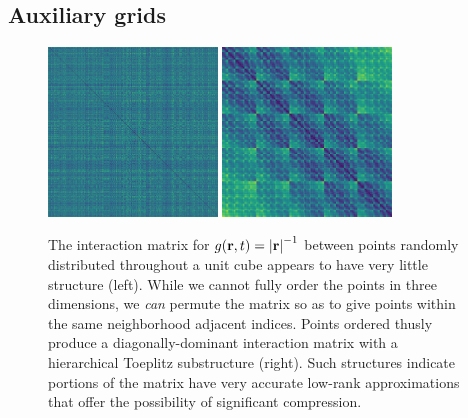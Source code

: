 \subsection{Auxiliary grids}

\begin{figure}
  \centering
  \includegraphics[width=0.4\textwidth]{figures/dist_mat_unsorted}
  \hspace{1cm}
  \includegraphics[width=0.4\textwidth]{figures/dist_mat_sorted}
  \caption{\label{fig:matrix structure} The interaction matrix for $g(\vb{r}, t) = \abs{\vb{r}}^{-1}$ between points randomly distributed throughout a unit cube appears to have very little structure (left).
    While we cannot fully order the points in three dimensions, we \emph{can} permute the matrix so as to give points within the same neighborhood adjacent indices.
    Points ordered thusly produce a diagonally-dominant interaction matrix with a hierarchical Toeplitz substructure (right).
    Such structures indicate portions of the matrix have very accurate low-rank approximations that offer the possibility of significant compression.
  }
\end{figure}

